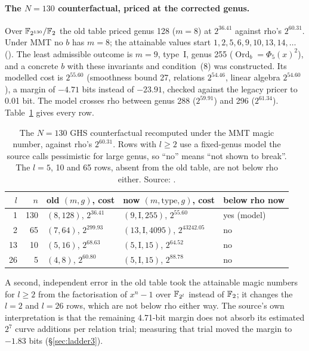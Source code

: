 \paragraph{The $N=130$ counterfactual, priced at the corrected genus.}
Over $\mathbb{F}_{2^{130}}/\mathbb{F}_2$ the old table priced genus 128 ($m=8$) at
$2^{36.41}$ against rho's $2^{60.31}$. Under MMT no $b$ has $m=8$; the
attainable values start $1,2,5,6,9,10,13,14,\dots$
(). The least
admissible outcome is $m=9$, type~I, genus 255
($\operatorname{Ord}_b=\Phi_5(x)^2$), and a concrete $b$ with these
invariants and condition~(8) was constructed. Its modelled cost is
$2^{55.60}$ (smoothness bound 27, relations $2^{54.46}$, linear algebra
$2^{54.60}$), a margin of $-4.71$ bits instead of $-23.91$, checked against
the legacy pricer to 0.01 bit. The model crosses rho between genus 288
($2^{59.91}$) and 296 ($2^{61.34}$). Table~\ref{tab:ghs-n130} gives every row.

\begin{table}[t]
\centering\small
\begin{tabular}{@{}rrlll@{}}
\toprule
$l$ & $n$ & old $(m,g)$, cost & now $(m,\text{type},g)$, cost & below rho now \\
\midrule
1 & 130 & $(8,128)$, $2^{36.41}$ & $(9,\mathrm{I},255)$, $2^{55.60}$ & yes (model) \\
2 & 65 & $(7,64)$, $2^{299.93}$ & $(13,\mathrm{I},4095)$, $2^{43242.05}$ & no \\
13 & 10 & $(5,16)$, $2^{68.63}$ & $(5,\mathrm{I},15)$, $2^{64.52}$ & no \\
26 & 5 & $(4,8)$, $2^{60.80}$ & $(5,\mathrm{I},15)$, $2^{88.78}$ & no \\
\bottomrule
\end{tabular}
\caption[]{The $N=130$ GHS counterfactual recomputed under the MMT magic
number, against rho's $2^{60.31}$. Rows with $l\ge2$ use a fixed-genus model
the source calls pessimistic for large genus, so ``no'' means ``not shown to
break''. The $l=5$, 10 and 65 rows, absent from the old table, are not below
rho either. Source: .}
\label{tab:ghs-n130}
\end{table} A second, independent error in the
old table took the attainable magic numbers for $l\ge2$ from the
factorisation of $x^n-1$ over $\mathbb{F}_{2^l}$ instead of $\mathbb{F}_2$; it changes the
$l=2$ and $l=26$ rows, which are not below rho either way. The source's
own interpretation is that the remaining 4.71-bit margin does not absorb
its estimated $2^7$ curve additions per relation trial; measuring that trial
moved the margin to $-1.83$ bits (\S\ref{sec:ladder3}).

